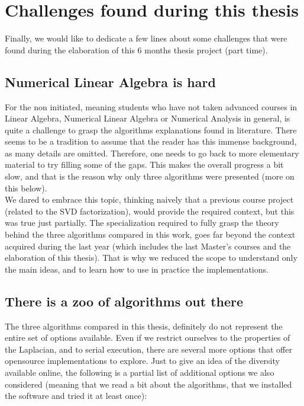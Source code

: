 \section{Challenges found during this thesis}

Finally, we would like to dedicate a few lines about some challenges
that were found during the elaboration of this 6 months thesis
project (part time).

\subsection{Numerical Linear Algebra is hard}

For the non initiated, meaning students who have not taken advanced
courses in Linear Algebra,  Numerical Linear Algebra or Numerical
Analysis in general, is quite a challenge to grasp the algorithms
explanations found in literature. There seems to be a tradition to
assume that the reader has this immense background, as many details
are omitted. Therefore, one needs to go back to more elementary
material to try filling some of the gaps. This makes the overall
progress a bit slow, and that is the reason why only three algorithms
were presented (more on this below). \\

We dared to embrace this topic, thinking naively that a previous
course project (related to the SVD factorization), would provide
the required context, but this was 
true just partially. The specialization required to fully grasp the
theory behind the three algorithms compared in this work, goes far beyond
the context acquired during the last year (which includes the last
Master's courses and the elaboration of this thesis). That is why we
reduced the scope to understand only the main ideas, and to learn how
to use in practice the implementations.


\subsection{There is a zoo of algorithms out there}

The three algorithms compared in this thesis, definitely do not represent
the entire set of options available. Even if we restrict ourselves to
the properties of the \gls{Laplacian}, and to serial execution, there are
several more options that offer opensource implementations to
explore. Just to give an idea of the diversity available online, the
following is a partial list of additional options we also considered
(meaning that we read a bit about the algorithms, that we installed
the software and tried it at least once):

